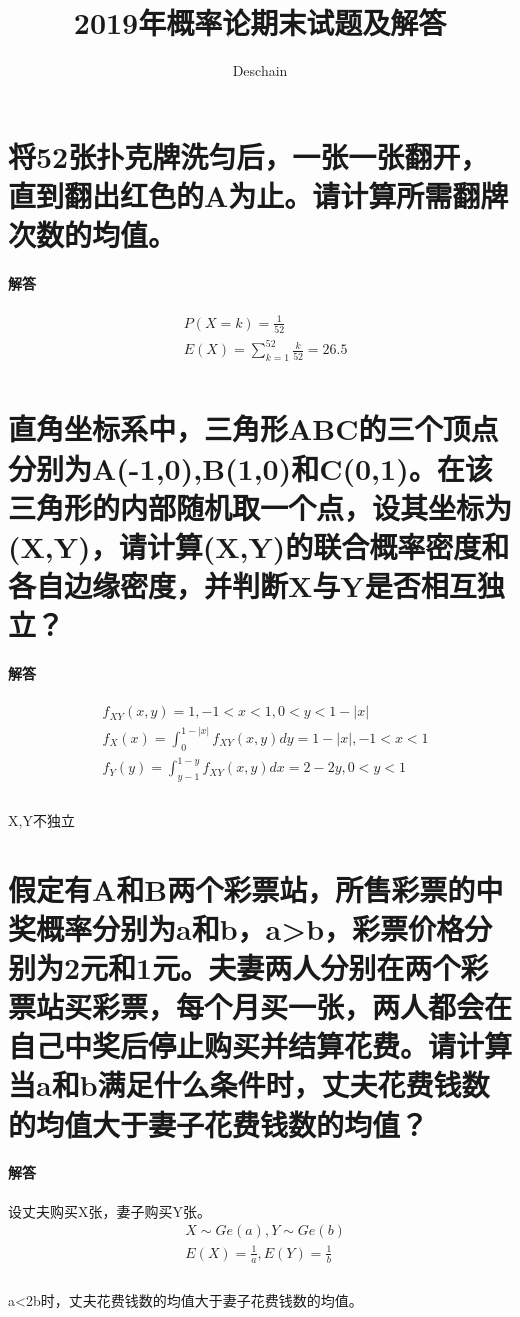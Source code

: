 \documentclass[UTF8]{ctexart}
\title{2019年概率论期末试题及解答}
\author{Deschain}
\begin{document}
\maketitle
\section{将52张扑克牌洗匀后，一张一张翻开，直到翻出红色的A为止。请计算所需翻牌次数的均值。}
\paragraph{解答}
\begin{equation*}
\begin{aligned}
&P(X=k)=\frac{1}{52}\\
&E(X)=\sum\limits_{k=1}^{52}\frac{k}{52}=26.5\\
\end{aligned}
\end{equation*}
\section{直角坐标系中，三角形ABC的三个顶点分别为A(-1,0),B(1,0)和C(0,1)。在该三角形的内部随机取一个点，设其坐标为(X,Y)，请计算(X,Y)的联合概率密度和各自边缘密度，并判断X与Y是否相互独立？}
\paragraph{解答}
\begin{equation*}
\begin{aligned}
&f_{XY}(x,y)=1,-1<x<1,0<y<1-\lvert x\rvert\\
&f_X(x)=\int_0^{1-\lvert x\rvert}f_{XY}(x,y)dy=1-\lvert x\rvert,-1<x<1\\
&f_Y(y)=\int_{y-1}^{1-y}f_{XY}(x,y)dx=2-2y,0<y<1\\
\end{aligned}
\end{equation*}
\\
X,Y不独立
\section{假定有A和B两个彩票站，所售彩票的中奖概率分别为a和b，a>b，彩票价格分别为2元和1元。夫妻两人分别在两个彩票站买彩票，每个月买一张，两人都会在自己中奖后停止购买并结算花费。请计算当a和b满足什么条件时，丈夫花费钱数的均值大于妻子花费钱数的均值？}
\paragraph{解答}
设丈夫购买X张，妻子购买Y张。
\begin{equation*}
\begin{aligned}
&X\sim Ge(a),Y\sim Ge(b)\\
&E(X)=\frac{1}{a},E(Y)=\frac{1}{b}\\
\end{aligned}
\end{equation*}
\\
a<2b时，丈夫花费钱数的均值大于妻子花费钱数的均值。
\end{document}
